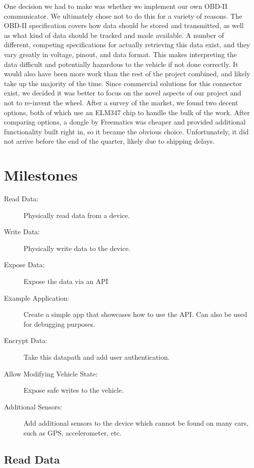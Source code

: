 \documentclass[10pt,letterpaper,unboxed,cm]{article}
\begin{document}
One decision we had to make was whether we implement our own OBD-II communicator. We ultimately chose not to do this for a variety of reasons. The OBD-II specification covers how data should be stored and transmitted, as well as what kind of data should be tracked and made available. A number of different, competing specifications for actually retrieving this data exist, and they vary greatly in voltage, pinout, and data format. This makes interpreting the data difficult and potentially hazardous to the vehicle if not done correctly. It would also have been more work than the rest of the project combined, and likely take up the majority of the time. Since commercial solutions for this connector exist, we decided it was better to focus on the novel aspects of our project and not to re-invent the wheel. After a survey of the market, we found two decent options, both of which use an ELM347 chip to handle the bulk of the work. After comparing options, a dongle by Freematics was cheaper and provided additional functionality built right in, so it became the obvious choice. Unfortunately, it did not arrive before the end of the quarter, likely due to shipping delays.

\section{Milestones}

\begin{description}

\item [Read Data:] Physically read data from a device.
\item [Write Data:] Physically write data to the device.
\item [Expose Data:] Expose the data via an API
\item [Example Application:] Create a simple app that showcases how to use the API. Can also be used for debugging purposes.
\item [Encrypt Data:] Take this datapath and add user authentication.
\item [Allow Modifying Vehicle State:] Expose safe writes to the vehicle.
\item [Additional Sensors:] Add additional sensors to the device which cannot be found on many cars, such as GPS, accelerometer, etc.

\end{description}

\subsection{Read Data}
\end{document}
